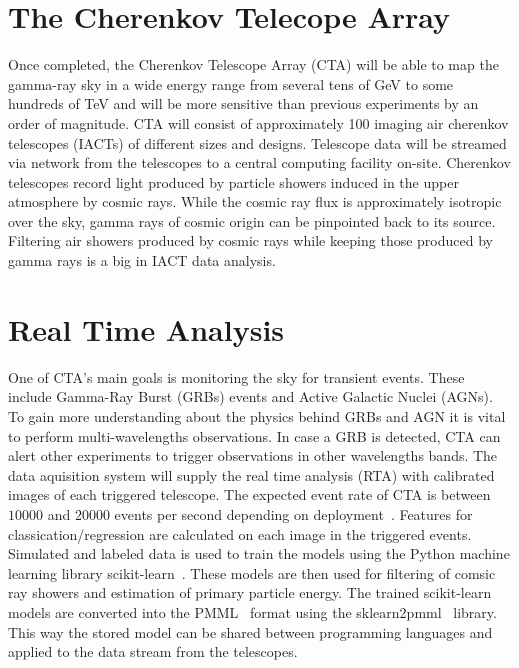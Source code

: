 \documentclass[11pt,twoside]{article}
\begin{document}
\section{The Cherenkov Telecope Array}
Once completed, the  Cherenkov Telescope Array (CTA)  will be able to map the gamma-ray sky
in a wide energy range from several tens of GeV to some hundreds of TeV and will be more sensitive
than previous experiments by an order of magnitude.
CTA will consist of approximately 100 imaging air cherenkov telescopes (IACTs) of different sizes and designs.
Telescope data will be streamed via network from the telescopes to a central computing facility
on-site.
Cherenkov telescopes record light produced by particle showers induced in the upper atmosphere by cosmic rays.
While the cosmic ray flux is approximately isotropic over the sky, gamma rays of cosmic origin can be pinpointed back to its source.
Filtering air showers produced by cosmic rays while keeping those produced by gamma rays is a big in IACT data analysis.



\section{Real Time Analysis}

One of CTA's main goals is monitoring the sky for transient events. 
These include Gamma-Ray Burst (GRBs) events and Active Galactic Nuclei (AGNs).
To gain more understanding about the physics behind GRBs and AGN it is vital to perform multi-wavelengths observations.
In case a GRB is detected,  CTA can alert other experiments to trigger observations in other wavelengths bands.
The data aquisition system will supply the real time analysis (RTA) with calibrated images of each triggered telescope.
The expected event rate of CTA is between $10000$ and $20000$ events per second depending on deployment~\citep{trigger}.
Features for classication/regression are calculated on each image in the triggered events.
Simulated and labeled data is used to train the models using the Python machine learning library scikit-learn~\citep{sklearn}.
These models are then used for filtering of comsic ray showers and estimation of primary particle energy.
The trained scikit-learn models are converted into the PMML~\citep{pmml} format using the sklearn2pmml~\citep{sklearn2pmml} library.
This way the stored model can be shared between programming languages and applied to the data stream from the telescopes.

\end{document}

